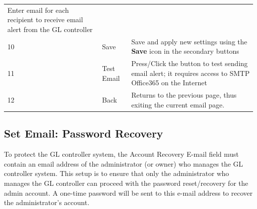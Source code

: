 \begin{longtable}[]{@{}lll@{}}
\begin{minipage}[t]{0.65\columnwidth}
Enter email for each recipient to receive email alert from the GL
controller\strut
\end{minipage}\tabularnewline
\begin{minipage}[t]{0.04\columnwidth}\raggedright
10\strut
\end{minipage} & \begin{minipage}[t]{0.23\columnwidth}\raggedright
Save\strut
\end{minipage} & \begin{minipage}[t]{0.65\columnwidth}\raggedright
Save and apply new settings using the \textbf{Save} icon in the
secondary buttons\strut
\end{minipage}\tabularnewline
\begin{minipage}[t]{0.04\columnwidth}\raggedright
11\strut
\end{minipage} & \begin{minipage}[t]{0.23\columnwidth}\raggedright
Test Email\strut
\end{minipage} & \begin{minipage}[t]{0.65\columnwidth}\raggedright
Press/Click the button to test sending email alert; it requires access
to SMTP Office365 on the Internet\strut
\end{minipage}\tabularnewline
\begin{minipage}[t]{0.04\columnwidth}\raggedright
12\strut
\end{minipage} & \begin{minipage}[t]{0.23\columnwidth}\raggedright
Back\strut
\end{minipage} & \begin{minipage}[t]{0.65\columnwidth}\raggedright
Returns to the previous page, thus exiting the current email page.\strut
\end{minipage}\tabularnewline
\bottomrule
\end{longtable}


\subsection{Set Email: Password
Recovery}

To protect the GL controller system, the Account Recovery E-mail field
must contain an email address of the administrator (or owner) who
manages the GL controller system. This setup is to ensure that only the
administrator who manages the GL controller can proceed with the
password reset/recovery for the admin account. A one-time password will
be sent to this e-mail address to recover the administrator's account.

